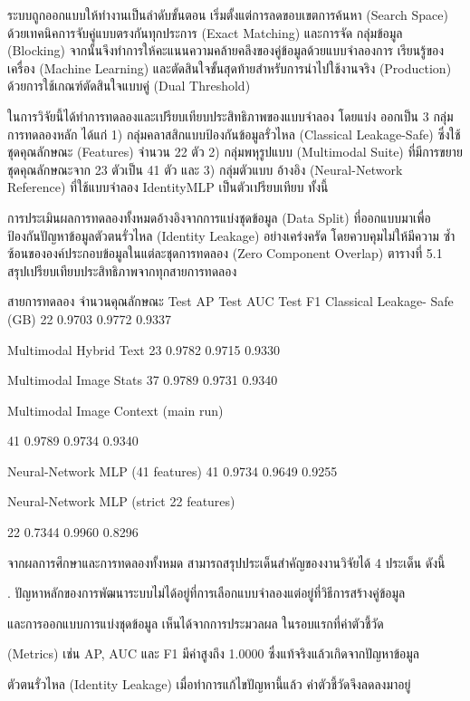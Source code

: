\documentclass[12pt,a4paper]{report}
\begin{document}
ระบบถูกออกแบบให้ทำงานเป็นลำดับขั้นตอน เริ่มตั้งแต่การลดขอบเขตการค้นหา (Search Space) ด้วยเทคนิคการจับคู่แบบตรงกันทุกประการ (Exact Matching) และการจัด กลุ่มข้อมูล (Blocking) จากนั้นจึงทำการให้คะแนนความคล้ายคลึงของคู่ข้อมูลด้วยแบบจำลองการ เรียนรู้ของเครื่อง (Machine Learning) และตัดสินใจขั้นสุดท้ายสำหรับการนำไปใช้งานจริง (Production) ด้วยการใช้เกณฑ์ตัดสินใจแบบคู่ (Dual Threshold)\par
ในการวิจัยนี้ได้ทำการทดลองและเปรียบเทียบประสิทธิภาพของแบบจำลอง โดยแบ่ง ออกเป็น 3 กลุ่มการทดลองหลัก ได้แก่ 1) กลุ่มคลาสสิกแบบป้องกันข้อมูลรั่วไหล (Classical Leakage-Safe) ซึ่งใช้ชุดคุณลักษณะ (Features) จำนวน 22 ตัว 2) กลุ่มพหุรูปแบบ (Multimodal Suite) ที่มีการขยายชุดคุณลักษณะจาก 23 ตัวเป็น 41 ตัว และ 3) กลุ่มตัวแบบ อ้างอิง (Neural-Network Reference) ที่ใช้แบบจำลอง IdentityMLP เป็นตัวเปรียบเทียบ ทั้งนี้\par
\clearpage
การประเมินผลการทดลองทั้งหมดอ้างอิงจากการแบ่งชุดข้อมูล (Data Split) ที่ออกแบบมาเพื่อ ป้องกันปัญหาข้อมูลตัวตนรั่วไหล (Identity Leakage) อย่างเคร่งครัด โดยควบคุมไม่ให้มีความ ซ้ำซ้อนขององค์ประกอบข้อมูลในแต่ละชุดการทดลอง (Zero Component Overlap) ตารางที่ 5.1 สรุปเปรียบเทียบประสิทธิภาพจากทุกสายการทดลอง\par
สายการทดลอง จำนวนคุณลักษณะ Test AP Test AUC Test F1 Classical Leakage- Safe (GB) 22 0.9703 0.9772 0.9337\par
Multimodal Hybrid Text 23 0.9782 0.9715 0.9330\par
Multimodal Image Stats 37 0.9789 0.9731 0.9340\par
Multimodal Image Context (main run)\par
41 0.9789 0.9734 0.9340\par
Neural-Network MLP (41 features) 41 0.9734 0.9649 0.9255\par
Neural-Network MLP (strict 22 features)\par
22 0.7344 0.9960 0.8296\par
จากผลการศึกษาและการทดลองทั้งหมด สามารถสรุปประเด็นสำคัญของงานวิจัยได้ 4 ประเด็น ดังนี้\par
{}. ปัญหาหลักของการพัฒนาระบบไม่ได้อยู่ที่การเลือกแบบจำลองแต่อยู่ที่วิธีการสร้างคู่ข้อมูล\par
และการออกแบบการแบ่งชุดข้อมูล เห็นได้จากการประมวลผล ในรอบแรกที่ค่าตัวชี้วัด\par
(Metrics) เช่น AP, AUC และ F1 มีค่าสูงถึง 1.0000 ซึ่งแท้จริงแล้วเกิดจากปัญหาข้อมูล\par
ตัวตนรั่วไหล (Identity Leakage) เมื่อทำการแก้ไขปัญหานี้แล้ว ค่าตัวชี้วัดจึงลดลงมาอยู่\par
\end{document}
